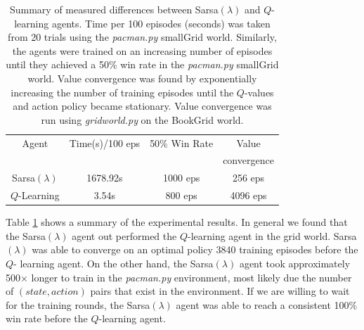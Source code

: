 \documentclass[10pt,conference]{IEEEtran}
\begin{document}
	\begin{table}
		\begin{tabular}{|c|c|c|c|}
			\hline
			Agent & Time(s)/100 eps & 50\% Win Rate & Value \\
			& & & convergence \\
			\hline \hline
			Sarsa\((\lambda)\) & 1678.92s & 1000 eps & 256 eps \\
			\hline
			\(Q\)-Learning & 3.54s & 800 eps & 4096 eps \\
			\hline
		\end{tabular}
		\caption{Summary of measured differences between Sarsa\((\lambda)\)
		and \(Q\)-learning agents.  Time per 100 episodes (seconds) was 
		taken from 20 trials using the \textit{pacman.py} smallGrid world.  
		Similarly, the agents were trained on an increasing number of episodes until 
		they achieved a 50\% win rate in the \textit{pacman.py} smallGrid 
		world.  Value convergence was found by exponentially increasing 
		the number of training episodes until the \(Q\)-values and 
		action policy became stationary.  Value convergence was run
		using \textit{gridworld.py} on the BookGrid world.}
		\label{summary}
	\end{table}
			
	Table \ref{summary} shows a summary of the experimental results.  In 
	general we found that the Sarsa\((\lambda)\) agent out performed the 
	\(Q\)-learning agent in the grid world.  Sarsa\((\lambda)\) was able to 
	converge on an optimal policy 3840 training episodes before the \(Q\)-
	learning agent.  On the other hand, the Sarsa\((\lambda)\) agent took approximately
	500\(\times\) longer to train in the \textit{pacman.py} environment, most 
	likely due the number of \((state, action)\) pairs that exist in the 
	environment.  If we are willing to wait for the training rounds, the 
	Sarsa\((\lambda)\) agent was able to reach a consistent 100\% win rate before
	the \(Q\)-learning agent. 
\end{document}
